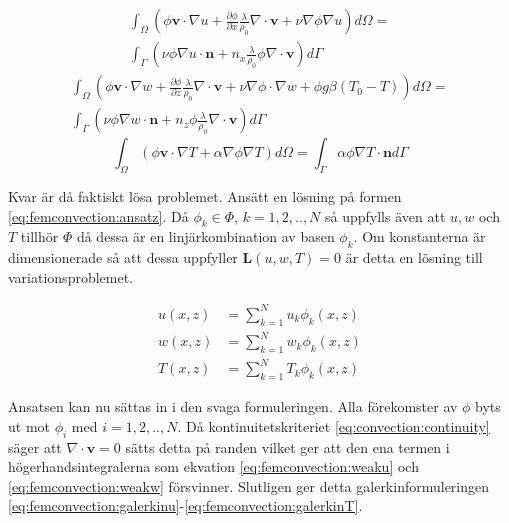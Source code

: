\begin{align}
\int_\Omega \left(\phi\mathbf{v}\cdot\nabla u +
\frac{\partial \phi}{\partial x}\frac{\lambda}{\rho_0}\nabla\cdot\mathbf{v}
+\nu\nabla\phi\nabla u\right)d\Omega = \nonumber \\
\int_\Gamma\left( \nu\phi\nabla u\cdot\mathbf{n} +
n_x\frac{\lambda}{\rho_0}\phi\nabla\cdot\mathbf{v}\right)d\Gamma
\label{eq:femconvection:weaku}
\end{align}
\begin{align}
\int_\Omega\left(\phi\mathbf{v}\cdot\nabla w
+ \frac{\partial \phi}{\partial z} \frac{\lambda}{\rho_0}\nabla\cdot\mathbf{v}
+ \nu\nabla\phi\cdot\nabla w + \phi g\beta(T_0-T)\right)d\Omega
= \nonumber \\
\int_\Gamma\left(\nu\phi\nabla w\cdot\mathbf{n} +
n_z\phi\frac{\lambda}{\rho_0}\nabla\cdot\mathbf{v}\right)d\Gamma
\label{eq:femconvection:weakw}
\end{align}
\begin{equation}
\int_\Omega\left(\phi\mathbf{v}\cdot\nabla T + \alpha\nabla\phi\nabla T\right)d\Omega
= \int_\Gamma \alpha\phi\nabla T\cdot\mathbf{n}d\Gamma
\label{eq:femconvection:weakT}
\end{equation}


\noindent
Kvar är då faktiskt lösa problemet.
Ansätt en lösning på formen \eqref{eq:femconvection:ansatz}.
Då $\phi_k \in \Phi$, $k=1,2,..,N$ så uppfylls även att $u,w$ och $T$ tillhör
$\Phi$ då dessa är en linjärkombination av basen $\phi_k$. Om konstanterna
är dimensionerade så att dessa uppfyller $\mathbf{L}(u,w,T) = 0$ är detta
en lösning till variationsproblemet. \cite{johnson2009}\cite{heath2002}\cite{lewis04}

\begin{align}
u(x,z) &= \sum^N_{k=1}u_k\phi_k(x,z)
\nonumber \\
w(x,z) &= \sum^N_{k=1}w_k\phi_k(x,z)
\nonumber \\
T(x,z) &= \sum^N_{k=1}T_k\phi_k(x,z)
\label{eq:femconvection:ansatz}
\end{align}

\noindent
Ansatsen kan nu sättas in i den svaga formuleringen.
Alla förekomster av $\phi$ byts ut mot $\phi_i$ med $i=1,2,..,N$. Då
kontinuitetskriteriet \eqref{eq:convection:continuity} säger att
$\nabla\cdot\mathbf{v} = 0$ sätts detta på randen vilket ger att den
ena termen i högerhandsintegralerna som ekvation \eqref{eq:femconvection:weaku} och
\eqref{eq:femconvection:weakw}
försvinner. Slutligen ger
detta galerkinformuleringen
\eqref{eq:femconvection:galerkinu}-\eqref{eq:femconvection:galerkinT}.

